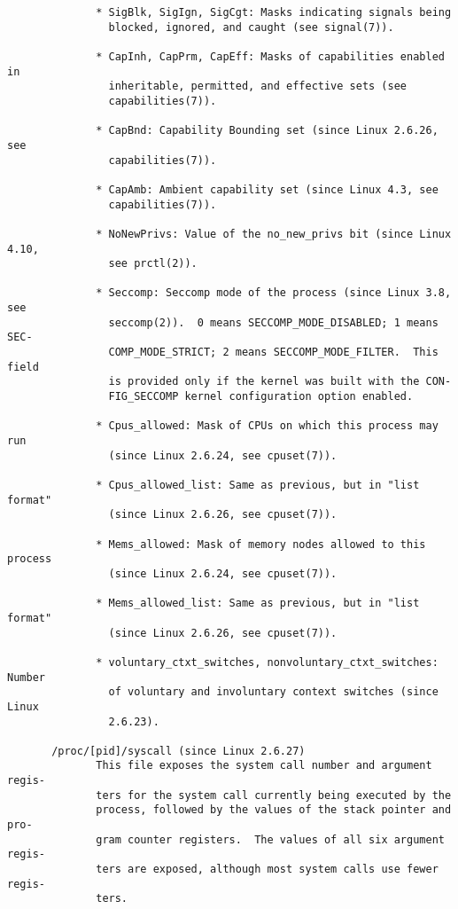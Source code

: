 \documentclass[]{article}
\begin{document}
\begin{verbatim}
              * SigBlk, SigIgn, SigCgt: Masks indicating signals being
                blocked, ignored, and caught (see signal(7)).

              * CapInh, CapPrm, CapEff: Masks of capabilities enabled in
                inheritable, permitted, and effective sets (see
                capabilities(7)).

              * CapBnd: Capability Bounding set (since Linux 2.6.26, see
                capabilities(7)).

              * CapAmb: Ambient capability set (since Linux 4.3, see
                capabilities(7)).

              * NoNewPrivs: Value of the no_new_privs bit (since Linux 4.10,
                see prctl(2)).

              * Seccomp: Seccomp mode of the process (since Linux 3.8, see
                seccomp(2)).  0 means SECCOMP_MODE_DISABLED; 1 means SEC‐
                COMP_MODE_STRICT; 2 means SECCOMP_MODE_FILTER.  This field
                is provided only if the kernel was built with the CON‐
                FIG_SECCOMP kernel configuration option enabled.

              * Cpus_allowed: Mask of CPUs on which this process may run
                (since Linux 2.6.24, see cpuset(7)).

              * Cpus_allowed_list: Same as previous, but in "list format"
                (since Linux 2.6.26, see cpuset(7)).

              * Mems_allowed: Mask of memory nodes allowed to this process
                (since Linux 2.6.24, see cpuset(7)).

              * Mems_allowed_list: Same as previous, but in "list format"
                (since Linux 2.6.26, see cpuset(7)).

              * voluntary_ctxt_switches, nonvoluntary_ctxt_switches: Number
                of voluntary and involuntary context switches (since Linux
                2.6.23).

       /proc/[pid]/syscall (since Linux 2.6.27)
              This file exposes the system call number and argument regis‐
              ters for the system call currently being executed by the
              process, followed by the values of the stack pointer and pro‐
              gram counter registers.  The values of all six argument regis‐
              ters are exposed, although most system calls use fewer regis‐
              ters.


\end{verbatim}
\end{document}
